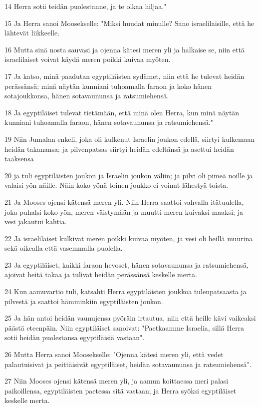 \par 14 Herra sotii teidän puolestanne, ja te olkaa hiljaa."
\par 15 Ja Herra sanoi Moosekselle: "Miksi huudat minulle? Sano israelilaisille, että he lähtevät liikkeelle.
\par 16 Mutta sinä nosta sauvasi ja ojenna kätesi meren yli ja halkaise se, niin että israelilaiset voivat käydä meren poikki kuivaa myöten.
\par 17 Ja katso, minä paadutan egyptiläisten sydämet, niin että he tulevat heidän perässänsä; minä näytän kunniani tuhoamalla faraon ja koko hänen sotajoukkonsa, hänen sotavaununsa ja ratsumiehensä.
\par 18 Ja egyptiläiset tulevat tietämään, että minä olen Herra, kun minä näytän kunniani tuhoamalla faraon, hänen sotavaununsa ja ratsumiehensä."
\par 19 Niin Jumalan enkeli, joka oli kulkenut Israelin joukon edellä, siirtyi kulkemaan heidän takanansa; ja pilvenpatsas siirtyi heidän edeltänsä ja asettui heidän taaksensa
\par 20 ja tuli egyptiläisten joukon ja Israelin joukon väliin; ja pilvi oli pimeä noille ja valaisi yön näille. Näin koko yönä toinen joukko ei voinut lähestyä toista.
\par 21 Ja Mooses ojensi kätensä meren yli. Niin Herra saattoi vahvalla itätuulella, joka puhalsi koko yön, meren väistymään ja muutti meren kuivaksi maaksi; ja vesi jakautui kahtia.
\par 22 Ja israelilaiset kulkivat meren poikki kuivaa myöten, ja vesi oli heillä muurina sekä oikealla että vasemmalla puolella.
\par 23 Ja egyptiläiset, kaikki faraon hevoset, hänen sotavaununsa ja ratsumiehensä, ajoivat heitä takaa ja tulivat heidän perässänsä keskelle merta.
\par 24 Kun aamuvartio tuli, katsahti Herra egyptiläisten joukkoa tulenpatsaasta ja pilvestä ja saattoi hämminkiin egyptiläisten joukon.
\par 25 Ja hän antoi heidän vaunujensa pyöräin irtautua, niin että heille kävi vaikeaksi päästä eteenpäin. Niin egyptiläiset sanoivat: "Paetkaamme Israelia, sillä Herra sotii heidän puolestansa egyptiläisiä vastaan".
\par 26 Mutta Herra sanoi Moosekselle: "Ojenna kätesi meren yli, että vedet palautuisivat ja peittäisivät egyptiläiset, heidän sotavaununsa ja ratsumiehensä".
\par 27 Niin Mooses ojensi kätensä meren yli, ja aamun koittaessa meri palasi paikoillensa, egyptiläisten paetessa sitä vastaan; ja Herra syöksi egyptiläiset keskelle merta.
